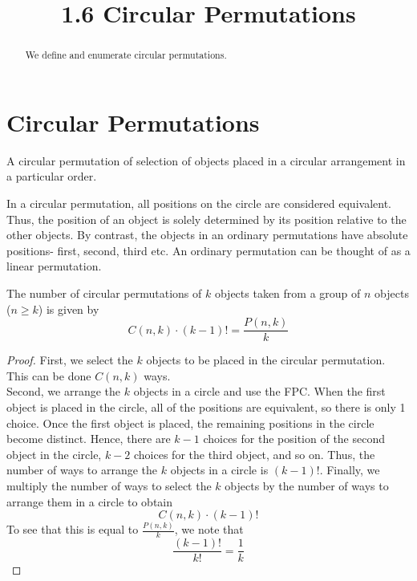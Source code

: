 \documentclass[handout]{ximera}
\title{1.6 Circular Permutations}
\begin{document}
\begin{abstract}
We define and enumerate circular permutations.
\end{abstract}

\maketitle

\section{Circular Permutations}



\begin{definition}
A circular permutation of selection of objects placed in a circular arrangement in a particular order.
\end{definition}


In a circular permutation, all positions on the circle are considered equivalent. Thus, the position of an object
is solely determined by its position relative to the other objects. By contrast, the objects in an ordinary permutations have 
absolute positions- first, second, third etc.  An ordinary permutation can be thought of as a linear permutation.\\

\begin{proposition}
The number of circular permutations of $k$ objects taken from a group of $n$ objects ($n \geq k$) is given by
\[
C(n,k)\cdot (k-1)! = \frac{P(n,k)}{k}
\]
\end{proposition}

\begin{proof}
First, we select the $k$ objects to be placed in the circular permutation.  This can be done $C(n,k)$ ways.\\
Second, we arrange the $k$ objects in a circle and use the FPC. When the first object is placed in the circle, all of the positions are equivalent, so there is only 1 choice. Once the first object is placed, the remaining positions in the circle become distinct.  Hence, there are $k-1$ choices for the position of the second object in the circle, $k-2$ choices for the 
third object, and so on. Thus, the number of ways to arrange the $k$ objects in a circle  is $(k-1)!$.
Finally, we multiply the number of ways to select the $k$ objects by the number of ways to arrange them in a circle to obtain
\[
C(n,k)\cdot (k-1)!
\]
To see that this is equal to $\frac{P(n,k)}{k}$, we note that 
\[
\frac{(k-1)!}{k!} = \frac{1}{k}
\]
\end{proof}
\end{document}
